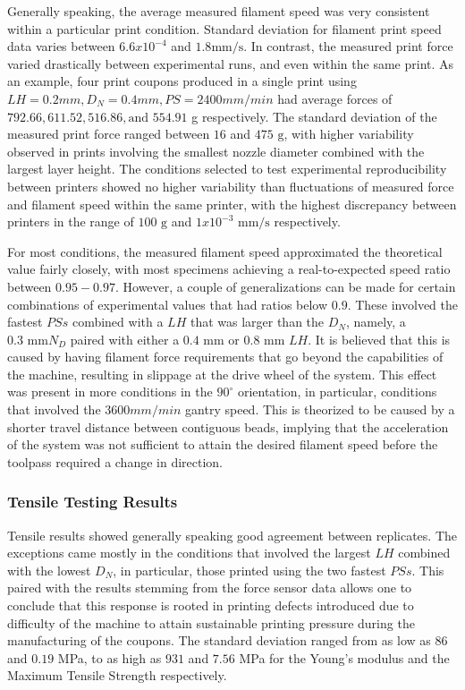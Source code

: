\documentclass[main.tex]{subfiles}
\begin{document}
Generally speaking, the average measured filament speed was very consistent within a particular print condition. Standard deviation for filament print speed data varies between $6.6x10^{-4}$ and $1.8 \text{mm/s}$. In contrast, the measured print force varied drastically between experimental runs, and even within the same print. As an example, four print coupons produced in a single print using $LH= 0.2 mm, D_{N} = 0.4 mm, PS = 2400 mm/min$ had average forces of $792.66, 611.52, 516.86, \text{and } 554.91$ g respectively. The standard deviation of the measured print force ranged between $16$ and $475\text{ g}$, with higher variability observed in prints involving the smallest nozzle diameter combined with the largest layer height. The conditions selected to test experimental reproducibility between printers showed no higher variability than fluctuations of measured force and filament speed within the same printer, with the highest discrepancy between printers in the range of $100 \text{ g}$ and $1x10^{-3} \text{ mm/s}$ respectively. 

For most conditions, the measured filament speed approximated the theoretical value fairly closely, with most specimens achieving a real-to-expected speed ratio between $0.95-0.97$. However, a couple of generalizations can be made for certain combinations of experimental values that had ratios below $0.9$. These involved the fastest $PSs$ combined with a $LH$ that was larger than the $D_{N}$, namely, a $0.3 \text{ mm} N_{D}$ paired with either a $0.4 \text{ mm}$ or $0.8 \text{ mm}$ $LH$. It is believed that this is caused by having filament force requirements that go beyond the capabilities of the machine, resulting in slippage at the drive wheel of the system. This effect was present in more conditions in the $90^{\circ}$ orientation, in particular, conditions that involved the $3600 mm/min$ gantry speed. This is theorized to be caused by a shorter travel distance between contiguous beads, implying that the acceleration of the system was not sufficient to attain the desired filament speed before the toolpass required a change in direction. 

\subsubsection{Tensile Testing Results}

Tensile results showed generally speaking good agreement between replicates. The exceptions came mostly in the conditions that involved the largest $LH$ combined with the lowest $D_{N}$, in particular, those printed using the two fastest $PSs$. This paired with the results stemming from the force sensor data allows one to conclude that this response is rooted in printing defects introduced due to difficulty of the machine to attain sustainable printing pressure during the manufacturing of the coupons. The standard deviation ranged from as low as $86$ and $0.19$ MPa, to as high as $931$ and $7.56$ MPa for the Young's modulus and the Maximum Tensile Strength respectively.
\end{document}
